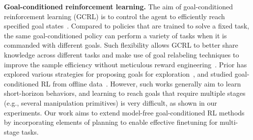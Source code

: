 
\textbf{Goal-conditioned reinforcement learning.} The aim of goal-conditioned reinforcement learning (GCRL) is to control the agent to efficiently reach specified goal states~\cite{Kaelbling1993LearningTA, Schaul2015UniversalVF, Eysenbach2021CLearningLT}. Compared to policies that are trained to solve a fixed task, the same goal-conditioned policy can perform a variety of tasks when it is commanded with different goals. Such flexibility allows GCRL to better share knowledge across different tasks and make use of goal relabeling techniques to improve the sample efficiency without meticulous reward engineering~\cite{Andrychowicz2017HindsightER, Pong2020SkewFitSS, Fang2019CurriculumguidedHE, Ding2019GoalconditionedIL, Gupta2019RelayPL, Sun2019PolicyCW, Eysenbach2020RewritingHW, Ghosh2021LearningTR}. Prior has explored various strategies for proposing goals for exploration~\cite{nair2018rig, Nair2019ContextualIG, Khazatsky2021WhatCI, ChaneSane2021GoalConditionedRL}, and studied goal-conditioned RL from offline data~\cite{chebotar2021actionable}. However, such works generally aim to learn short-horizon behaviors, and learning to reach goals that require multiple stages (e.g., several manipulation primitives) is very difficult, as shown in our experiments. Our work aims to extend model-free goal-conditioned RL methods by incorporating elements of planning to enable effective finetuning for multi-stage tasks.

